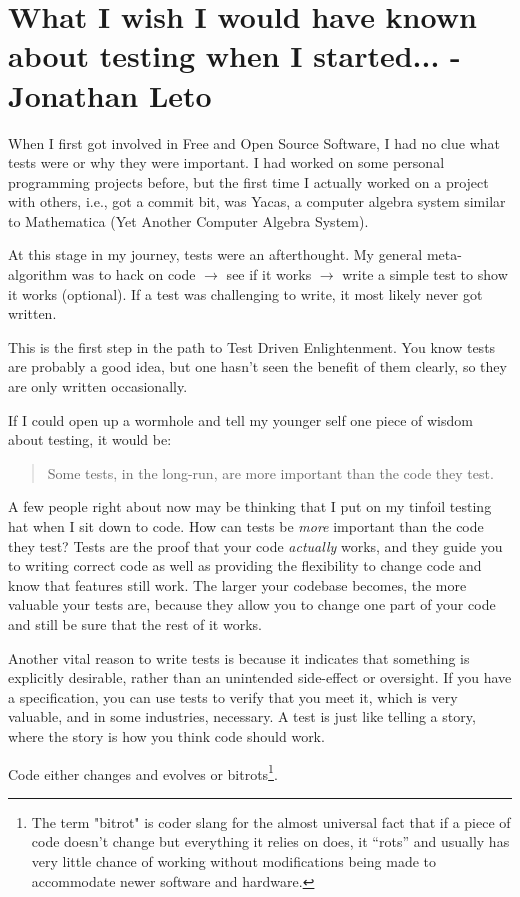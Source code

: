 \chapter{What I wish I would have known about testing when I started... - Jonathan Leto}
When I first got involved in Free and Open Source Software, I had no clue what tests were or why they were important. I had worked on some personal programming projects before, but the first time I actually worked on a project with others, i.e., got a commit bit, was Yacas, a computer algebra system similar to Mathematica (Yet Another Computer Algebra System).

At this stage in my journey, tests were an afterthought. My general meta-algorithm was to hack on code $\rightarrow$ see if it works $\rightarrow$ write a simple test to show it works (optional). If a test was challenging to write, it most likely never got written.

This is the first step in the path to Test Driven Enlightenment. You know tests are probably a good idea, but one hasn't seen the benefit of them clearly, so they are only written occasionally.

If I could open up a wormhole and tell my younger self one piece of wisdom about testing, it would be:
\begin{quote}
Some tests, in the long-run, are more important than the code they test.                                                                        \end{quote}

A few people right about now may be thinking that I put on my tinfoil testing hat when I sit down to code. How can tests be \emph{more} important than the code they test? Tests are the proof that your code \emph{actually} works, and they guide you to writing correct code as well as providing the flexibility to change code and know that features still work. The larger your codebase becomes, the more valuable your tests are, because they allow you to change one part of your code and still be sure that the rest of it works.

Another vital reason to write tests is because it indicates that something is explicitly desirable, rather than an unintended side-effect or oversight. If you have a specification, you can use tests to verify that you meet it, which is very valuable, and in some industries, necessary. A test is just like telling a story, where the story is how you think code should work.

Code either changes and evolves or bitrots\footnote{The term "bitrot" is coder slang for the almost universal fact that if a piece of code doesn't change but everything it relies on does, it ``rots'' and usually has very little chance of working without modifications being made to accommodate newer software and hardware.}.


